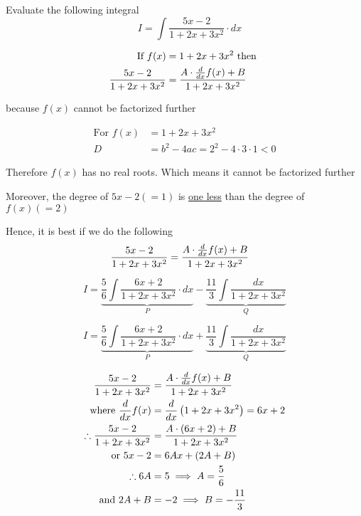 \documentclass[14pt,fleqn]{extarticle}
\begin{document}
\newcommand\ea{1+2x+3x^2} 
\newcommand\intga{ \frac{5}{6}\log \left(\ea \right)}
\newcommand\intgb{ \frac{11}{3\sqrt{2}}\tan^{-1} \left( \frac{3x+1}{\sqrt{2}}\right) }

\newcommand\trma{ \left(x + \frac{1}{3} \right)}
\newcommand\trmk{ \left(\frac{\sqrt{2}}{3} \right) }

Evaluate the following integral 
\[ \quad I = \int \frac{5x-2}{\ea}\cdot dx \]

%

\newcard

\begin{align}
\text{If } f(x) &= \ea\text{ then } \\ 
	\frac{5x-2}{\ea} &= \frac{A\cdot\ddx f(x) + B}{\ea} 
\end{align}

because $f(x)$ cannot be factorized further 

\newcard 

\begin{align}
	\text{For } f(x) &= \ea \\ 
	D &= b^2-4ac = 2^2 - 4\cdot 3\cdot 1 < 0 
\end{align}

Therefore $f(x)$ has no real roots. Which means it cannot be factorized further \newline 

Moreover, the degree of $5x-2 (=1)$ is \underline{one less} than the degree of $f(x) (=2)$\newline 

Hence, it is best if we do the following 
\begin{align}
	\frac{5x-2}{\ea} &= \frac{A\cdot \ddx f(x) + B}{\ea}
\end{align}

\newcard 

\[ I = \underbrace{\frac{5}{6}\int \frac{6x+2}{\ea}\cdot dx }_P - \underbrace{\frac{11}{3}\int \frac{dx}{\ea}}_Q \]

\newcard 

\[ I = \underbrace{\frac{5}{6}\int \frac{6x+2}{\ea}\cdot dx }_P + \underbrace{\frac{11}{3}\int \frac{dx}{\ea}}_Q \]

\newcard 

\begin{align}
\frac{5x-2}{\ea} &= \frac{A\cdot \ddx f(x)+B}{\ea} \\
\text{where }\ddx f(x) &= \ddx \left(\ea \right) = 6x + 2 \\
\therefore \frac{5x-2}{\ea} &= \frac{A\cdot \left(6x+2 \right) + B}{\ea} \\
\text{or } 5x - 2 &= 6A x + \left(2A + B \right) \\
\therefore 6A &= 5 \implies A = \frac{5}{6} \\
\text{and } 2A + B &= -2 \implies B = -\frac{11}{3}
\end{align}
\end{document}
